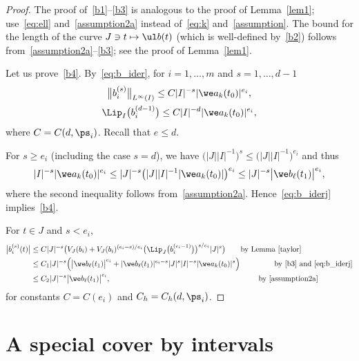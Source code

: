 \begin{proof}
 The proof of~\eqref{b1}--\eqref{b3} is analogous to the proof of Lemma~\ref{lem1}; use~\eqref{eq:ell} and~\eqref{assumption2a}
 instead of~\eqref{eq:k} and~\eqref{assumption}. The bound for the length of the curve $J \ni t \mapsto \ul b(t)$ (which is
 well-defined by~\eqref{b2})
 follows from~\eqref{assumption2a}--\eqref{b3}; see the proof of Lemma~\ref{lem1}.

 Let us prove~\eqref{b4}. By~\eqref{eq:b_ider}, for $i = 1,\dots,m$ and $s= 1,\dots,d-1$
 \begin{gather}
 \big\| b_i^{(s)} \big\|_{L^\infty(I)} \le C |I|^{-s} |\we a_k (t_0)|^{e_i},\nonumber
 \\
 \Lip_I\big( b_i^{(d-1)}\big) \le C |I|^{-d} | \we a_k (t_0)|^{e_i},
 \label{eq:b_iderj}
 \end{gather}
 where $C = C(d, \ps_i)$. Recall that $e \le d$.

 For $s\ge e_i$ (including the case $s = d$), we have $\big(|J||I|^{-1}\big)^s \le \big(|J||I|^{-1}\big)^{e_i}$ and thus
 \begin{gather*}
 | I |^{-s} |\we a_k(t_0)|^{e_i}
 \le | J |^{-s} \big(|J| |I|^{-1} |\we a_k(t_0)| \big)^{e_i}
 \le | J |^{-s} \big|\we b_\ell(t_1)\big|^{e_i},
 \end{gather*}
 where the second inequality follows from~\eqref{assumption2a}. Hence~\eqref{eq:b_iderj} implies~\eqref{b4}.


 For $t\in J$ and $s< e_i$,
 \begin{align*}
 \big|b_i^{(s)}(t) \big|
 &\le C | J |^{-s} \bigl ( V_J(b_i)
 + V_J(b_i)^{(e_i-s)/e_i} \big(\Lip_J \big(b_i^{(e_i-1)}\big)\big)^{s/e_i} |J|^s \bigr)
 \hspace{7mm} \text{by Lemma~\ref{taylor}}
 \\
 &\le C_1 | J |^{-s} \Bigl ( \big|\we b_\ell(t_1)\big|^{e_i}
 + |\we b_\ell(t_1)|^{e_i-s} |J|^s |I|^{-s} |\we a_k(t_0)|^{s} \Bigr)
 \hspace{16mm} \text{by~\eqref{b3} and~\eqref{eq:b_iderj}}
 \\
 &\le C_2 | J |^{-s} \big|\we b_\ell(t_1)\big|^{e_i}, \hspace{69mm} \text{by~\eqref{assumption2a}}
 \end{align*}
 for constants $C = C(e_i)$ and $C_h = C_h(d,\ps_i)$.
\end{proof}


\section{A special cover by intervals} %

